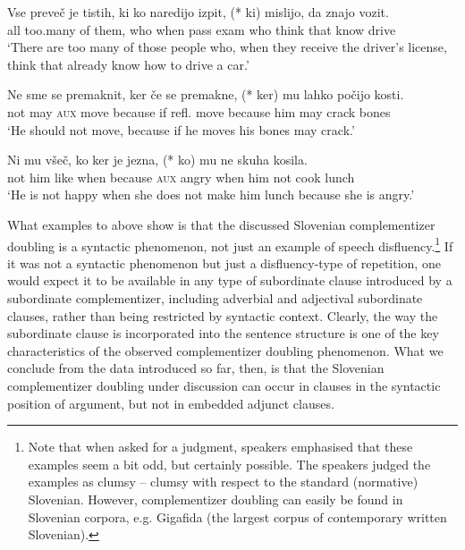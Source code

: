\documentclass[output=paper,
]{langscibook}
\begin{document}
\begin{exe} 
\ex \label{ex:plesnicar:eleven}
\gll  Vse	preveč	je	tistih,	ki 	ko	naredijo	izpit,	(*\hspace{-2pt} ki) mislijo,	da	znajo	vozit.\\
	all	too.many of them,	who	when	pass		exam	{} who think		that	know	drive\\
\trans `There are too many of those people who, when they receive the driver's license, think that already know how to drive a car.' %
\end{exe}
\begin{exe} 

\ex \label{ex:plesnicar:twelve}
\gll Ne	sme	se	premaknit,	ker		če	se	premakne, (*\hspace{-2pt} ker)		mu	lahko	počijo	kosti.\\
	not	may	\textsc{aux}	move	because	if	refl.	move {} because	him	may	crack	bones\\
\trans `He should not move, because if he moves his bones may crack.' 
\end{exe}


\begin{exe} 
\ex \label{ex:plesnicar:thirteen}
\gll Ni	mu	všeč,	ko	ker		je	jezna,	(*\hspace{-2pt} ko)	mu	ne	skuha kosila. \\
	not	him	like	when	because	\textsc{aux}	angry	{} when	him	not	cook lunch \\
\trans `He is not happy when she does not make him lunch because she is angry.' 
\end{exe}

\noindent What examples  to  above show is that the discussed Slovenian complementizer doubling is a syntactic phenomenon, not just an example of speech disfluency.\footnote{Note that when asked for a judgment, speakers emphasised that these examples seem a bit odd, but certainly possible. The speakers judged the examples as clumsy – clumsy with respect to the standard (normative) Slovenian. However, complementizer doubling can easily be found in Slovenian corpora, e.g. Gigafida (the largest corpus of contemporary written Slovenian).} If it was not a syntactic phenomenon but just a disfluency-type of repetition, one would expect it to be available in any type of subordinate clause introduced by a subordinate complementizer, including adverbial and adjectival subordinate clauses, rather than being restricted by syntactic context. Clearly, the way the subordinate clause is incorporated into the sentence structure is one of the key characteristics of the observed complementizer doubling phenomenon. What we conclude from the data introduced so far, then, is that the Slovenian complementizer doubling under discussion can occur in clauses in the syntactic position of argument, but not in embedded adjunct clauses.
\end{document}

